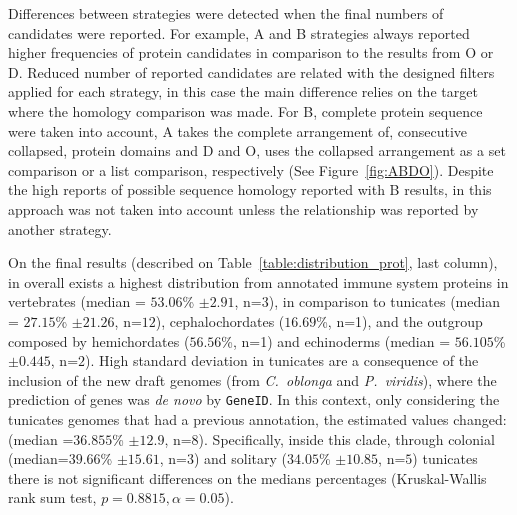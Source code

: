 \documentclass[11pt]{article}
\begin{document}
Differences between strategies were detected when the final numbers of candidates were
 reported. For example, A and B strategies always reported higher frequencies of 
protein candidates in comparison to the results from O or D. Reduced number of
reported candidates are related with the designed filters applied for each
strategy, in this case the main difference relies on the target where the
homology comparison was made. For B, complete protein sequence were taken into
account, A takes the complete arrangement of, consecutive collapsed, protein domains
and D and O, uses the collapsed arrangement as a set comparison or a 
list comparison, respectively (See Figure~\ref{fig:ABDO}). Despite the high reports of
possible sequence homology reported with B results, in this approach was not taken
into account unless the relationship was reported by another strategy.

On the final results (described on Table~\ref{table:distribution_prot}, last column),
in overall exists a highest distribution from  annotated immune system proteins 
in vertebrates (median = $53.06$\% $\pm 2.91$, n=$3$), in comparison to tunicates 
(median = $27.15$\% $\pm 21.26$, n=$12$), cephalochordates ($16.69$\%, n=1), and 
the outgroup composed by hemichordates ($56.56$\%, n=1) and echinoderms (median = 
$56.105$\% $\pm 0.445$, n=$2$). High standard deviation in tunicates are a consequence 
of the inclusion of the new draft genomes (from \textit{C.\ oblonga} and \textit{P.\ viridis}), 
where the prediction of genes was \textsl{de novo} by \texttt{GeneID}. In this context, 
only considering the tunicates genomes that had a previous annotation, the 
estimated values changed: (median =$36.855$\% $\pm 12.9$, n=8). Specifically, inside this 
clade, through colonial (median=$39.66$\% $\pm 15.61$, n=$3$) and solitary 
($34.05$\% $\pm 10.85$, n=$5$) tunicates there is not significant differences on the 
medians percentages (Kruskal-Wallis rank sum test, $p=0.8815, \alpha=0.05$).
\end{document}
